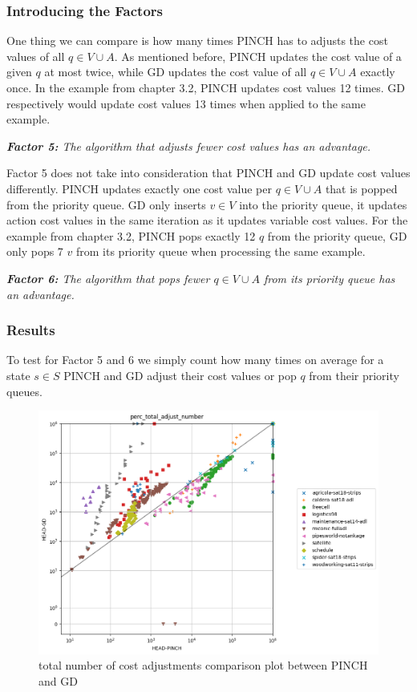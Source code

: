 \subsubsection{Introducing the Factors}
One thing we can compare is how many times PINCH has to adjusts the cost values of all $q \in V \cup A$. As mentioned before, PINCH updates the cost value of a given $q$ at most twice, while GD updates the cost value of all $q \in V \cup A$ exactly once. In the example from chapter 3.2, PINCH updates cost values 12 times. GD respectively would update cost values 13 times when applied to the same example. 
\begin{center}
\textit{\textbf{Factor 5:} The algorithm that adjusts fewer cost values has an advantage.}
\end{center}
Factor 5 does not take into consideration that PINCH and GD update cost values differently. PINCH updates exactly one cost value per $q \in V \cup A$ that is popped from the priority queue. GD only inserts $v \in V$ into the priority queue, it updates action cost values in the same iteration as it updates variable cost values. For the example from chapter 3.2, PINCH pops exactly 12 $q$ from the priority queue, GD only pops 7 $v$ from its priority queue when processing the same example.
\begin{center}
\textit{\textbf{Factor 6:} The algorithm that pops fewer $q \in V \cup A$ from its priority queue has an advantage.}
\end{center}
\subsubsection{Results}
To test for Factor 5 and 6 we simply count how many times on average for a state $s \in S$ PINCH and GD adjust their cost values or pop $q$ from their priority queues. \\
\begin{figure}
    \centering
    \includegraphics[width=.7\columnwidth]{plotSearchcost.png}
    \caption{total number of cost adjustments comparison plot between PINCH and GD}
    \label{fig:my_label}
\end{figure}
\newpage

